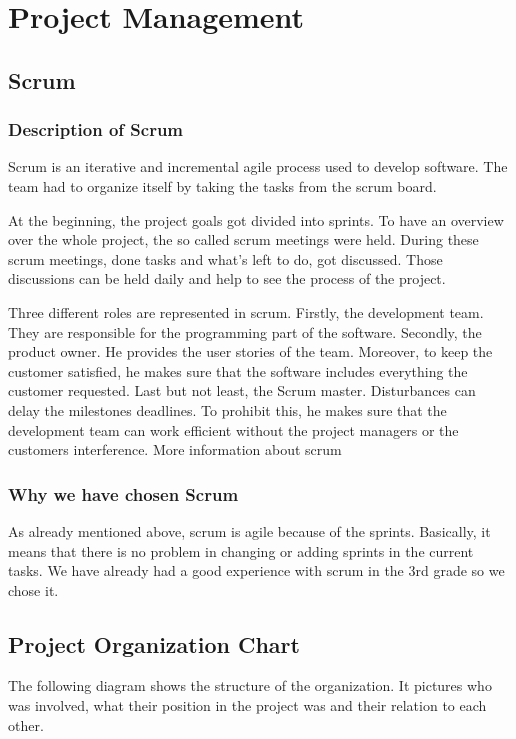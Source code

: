 \chapter{Project Management}
\section{Scrum}
\subsection{Description of Scrum}
Scrum is an iterative and incremental agile process used to develop software. The team had to organize itself by taking the tasks from the scrum board.

At the beginning, the project goals got divided into sprints. To have an overview over the whole project, the so called scrum meetings were held. During these scrum meetings, done tasks and what's left to do, got discussed. Those discussions can be held daily and help to see the process of the project.

Three different roles are represented in scrum. Firstly, the development team. They are responsible for the programming part of the software. Secondly, the product owner. He provides the user stories of the team. Moreover, to keep the customer satisfied, he makes sure that the software includes everything the customer requested. Last but not least, the Scrum master. Disturbances can delay the milestones deadlines. To prohibit this, he makes sure that the development team can work efficient without the project managers or the customers interference.
More information about scrum \cite{Scrum} 
\subsection{Why we have chosen Scrum}
As already mentioned above, scrum is agile because of the sprints. Basically, it means that there is no problem in changing or adding sprints in the current tasks. We have already had a good experience with scrum in the 3rd grade so we chose it.
\newpage
\section{Project Organization Chart}
The following diagram shows the structure of the organization. It pictures who was involved, what their position in the project was and their relation to each other. 

